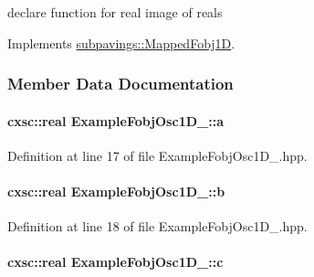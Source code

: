 declare function for real image of reals 



\-Implements \hyperlink{classsubpavings_1_1MappedFobj1D_abee3fbd4c06d7d2f6e276f31d485eb7c}{subpavings\-::\-Mapped\-Fobj1\-D}.



\subsubsection{\-Member \-Data \-Documentation}
\hypertarget{classExampleFobjOsc1D__1_a371c4cfcdc6011f9c796d8e6cd24494b}{
\paragraph[{a}]{\setlength{\rightskip}{0pt plus 5cm}cxsc\-::real {\bf \-Example\-Fobj\-Osc1\-D\-\_\-::a}}}\label{classExampleFobjOsc1D__1_a371c4cfcdc6011f9c796d8e6cd24494b}


\-Definition at line 17 of file \-Example\-Fobj\-Osc1\-D\-\_.\-hpp.

\hypertarget{classExampleFobjOsc1D__1_a50c832e32ed120fde351e76f2b8b38e5}{
\paragraph[{b}]{\setlength{\rightskip}{0pt plus 5cm}cxsc\-::real {\bf \-Example\-Fobj\-Osc1\-D\-\_\-::b}}}\label{classExampleFobjOsc1D__1_a50c832e32ed120fde351e76f2b8b38e5}


\-Definition at line 18 of file \-Example\-Fobj\-Osc1\-D\-\_.\-hpp.

\hypertarget{classExampleFobjOsc1D__1_a0e59d645d1ce8fc7f8e200aeb6e1c5c5}{
\paragraph[{c}]{\setlength{\rightskip}{0pt plus 5cm}cxsc\-::real {\bf \-Example\-Fobj\-Osc1\-D\-\_\-::c}}}\label{classExampleFobjOsc1D__1_a0e59d645d1ce8fc7f8e200aeb6e1c5c5}


